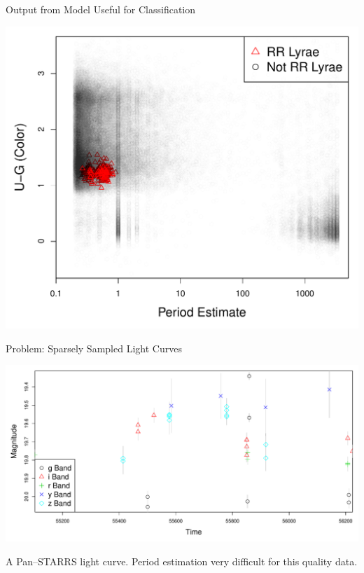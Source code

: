 \documentclass[12pt]{beamer}
\begin{document}
\begin{frame}{Output from Model Useful for Classification}

\begin{center}
\includegraphics[scale=.4]{figs/sdss_color_period.pdf}
\end{center}



\end{frame}


\begin{frame}{Problem: Sparsely Sampled Light Curves}


\begin{center}
\includegraphics[scale=.3]{figs/unfolded_panstarrs.pdf}
\end{center}


\begin{center}
A Pan--STARRS light curve. Period estimation very difficult for this quality data.
\end{center}

\end{frame}
\end{document}
